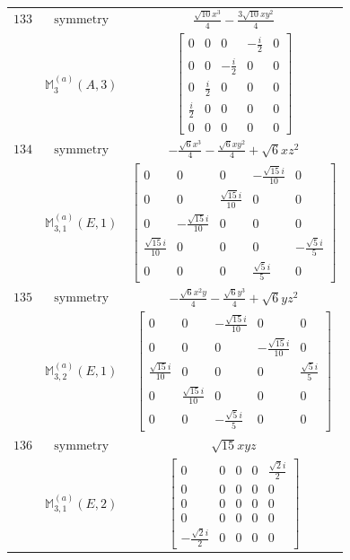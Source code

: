 \documentclass[fleqn,8pt,landscape]{jsarticle}
\begin{document}
\begin{longtable}{ccc}
$ 133 $ & $ \text{symmetry} $ & $ \frac{\sqrt{10} x^{3}}{4} - \frac{3 \sqrt{10} x y^{2}}{4} $ \\
$  $ & $ \mathbb{M}_{3}^{(a)}(A,3) $ & $ \begin{bmatrix} 0 & 0 & 0 & - \frac{i}{2} & 0 \\ 0 & 0 & - \frac{i}{2} & 0 & 0 \\ 0 & \frac{i}{2} & 0 & 0 & 0 \\ \frac{i}{2} & 0 & 0 & 0 & 0 \\ 0 & 0 & 0 & 0 & 0 \end{bmatrix} $ \\ \hline
$ 134 $ & $ \text{symmetry} $ & $ - \frac{\sqrt{6} x^{3}}{4} - \frac{\sqrt{6} x y^{2}}{4} + \sqrt{6} x z^{2} $ \\
$  $ & $ \mathbb{M}_{3,1}^{(a)}(E,1) $ & $ \begin{bmatrix} 0 & 0 & 0 & - \frac{\sqrt{15} i}{10} & 0 \\ 0 & 0 & \frac{\sqrt{15} i}{10} & 0 & 0 \\ 0 & - \frac{\sqrt{15} i}{10} & 0 & 0 & 0 \\ \frac{\sqrt{15} i}{10} & 0 & 0 & 0 & - \frac{\sqrt{5} i}{5} \\ 0 & 0 & 0 & \frac{\sqrt{5} i}{5} & 0 \end{bmatrix} $ \\ \hline
$ 135 $ & $ \text{symmetry} $ & $ - \frac{\sqrt{6} x^{2} y}{4} - \frac{\sqrt{6} y^{3}}{4} + \sqrt{6} y z^{2} $ \\
$  $ & $ \mathbb{M}_{3,2}^{(a)}(E,1) $ & $ \begin{bmatrix} 0 & 0 & - \frac{\sqrt{15} i}{10} & 0 & 0 \\ 0 & 0 & 0 & - \frac{\sqrt{15} i}{10} & 0 \\ \frac{\sqrt{15} i}{10} & 0 & 0 & 0 & \frac{\sqrt{5} i}{5} \\ 0 & \frac{\sqrt{15} i}{10} & 0 & 0 & 0 \\ 0 & 0 & - \frac{\sqrt{5} i}{5} & 0 & 0 \end{bmatrix} $ \\ \hline
$ 136 $ & $ \text{symmetry} $ & $ \sqrt{15} x y z $ \\
$  $ & $ \mathbb{M}_{3,1}^{(a)}(E,2) $ & $ \begin{bmatrix} 0 & 0 & 0 & 0 & \frac{\sqrt{2} i}{2} \\ 0 & 0 & 0 & 0 & 0 \\ 0 & 0 & 0 & 0 & 0 \\ 0 & 0 & 0 & 0 & 0 \\ - \frac{\sqrt{2} i}{2} & 0 & 0 & 0 & 0 \end{bmatrix} $ \\ \hline

\end{longtable}
\end{document}
